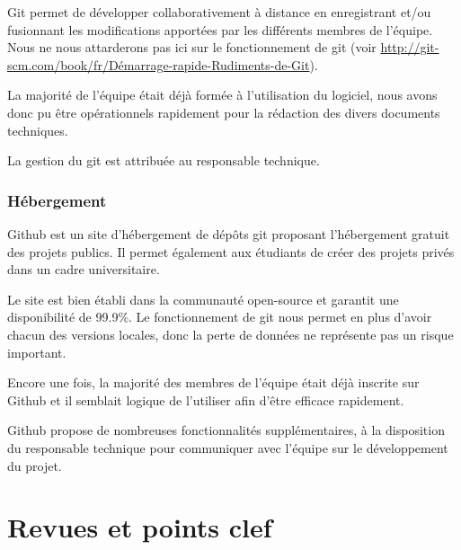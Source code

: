 \documentclass{../../res/univ-projet}
\begin{document}
	Git permet de développer collaborativement à distance en enregistrant et/ou fusionnant les modifications apportées par les différents membres de l'équipe. Nous ne nous attarderons pas ici sur le fonctionnement de git (voir \href{http://git-scm.com/book/fr/Démarrage-rapide-Rudiments-de-Git}{http://git-scm.com/book/fr/Démarrage-rapide-Rudiments-de-Git}).

	La majorité de l'équipe était déjà formée à l'utilisation du logiciel, nous avons donc pu être opérationnels rapidement pour la rédaction des divers documents techniques.

	La gestion du git est attribuée au responsable technique.

\subsubsection{Hébergement}
	Github est un site d'hébergement de dépôts git proposant l'hébergement gratuit des projets publics. Il permet également aux étudiants de créer des projets privés dans un cadre universitaire.

	Le site est bien établi dans la communauté open-source et garantit une disponibilité de 99.9\%. Le fonctionnement de git nous permet en plus d'avoir chacun des versions locales, donc la perte de données ne représente pas un risque important.

	Encore une fois, la majorité des membres de l'équipe était déjà inscrite sur Github et il semblait logique de l'utiliser afin d'être efficace rapidement. 

	Github propose de nombreuses fonctionnalités supplémentaires, à la disposition du responsable technique pour communiquer avec l'équipe sur le développement du projet.

\newpage
\section{Revues et points clef}
\end{document}
